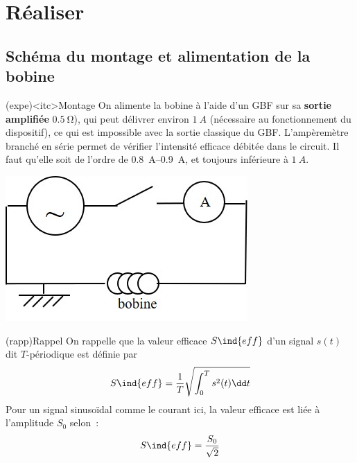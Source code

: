 \documentclass[../main/main.tex]{subfiles}
\begin{document}
\section{Réaliser}
\subsection{Schéma du montage et alimentation de la bobine}
\begin{tcb}[sidebyside, righthand ratio=.40](expe)<itc>{Montage}
	On alimente la bobine à l'aide d'un GBF sur sa \textbf{sortie amplifiée}
	$\SI{0,5}{\ohm}$), qui peut délivrer environ $\SI{1}{A}$ (nécessaire au
	fonctionnement du dispositif), ce qui est impossible avec la sortie
	classique du GBF.
	\bigbreak
	L'ampèremètre branché en série permet de vérifier l'intensité efficace
	débitée dans le circuit. Il faut qu'elle soit de l'ordre de
	\SIrange{0.8}{0.9}{A}, et toujours inférieure à $\SI{1}{A}$.
	\tcblower
	\begin{center}
		\includegraphics[width=\linewidth]{gamma3}
	\end{center}
\end{tcb}

\begin{tcb}[sidebyside](rapp){Rappel}
	On rappelle que la valeur efficace $S\ind{eff}$ d'un signal $s(t)$ dit
	$T$-périodique est définie par
	\[
		S\ind{eff} = \frac{1}{T} \sqrt{\int_{0}^{T} s^2(t)\dd t}
	\]
	\tcblower
	Pour un signal sinusoïdal comme le courant ici, la valeur efficace est liée
	à l'amplitude $S_0$ selon~:
	\[
		S\ind{eff} = \frac{S_0}{\sqrt{2}}
	\]
\end{tcb}
\end{document}
